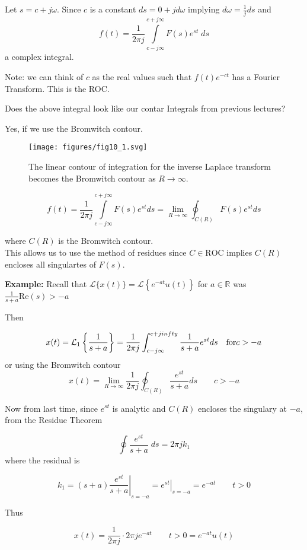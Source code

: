 \documentclass{article}
\begin{document}
Let $s=c+j \omega$. Since $c$ is a constant $ds = 0+j d\omega$ implying $d \omega=\frac{1}{j} d s$
and
$$
f(t)=\frac{1}{2 \pi j} \int\limits_{c-j\infty}^{c+j\infty} F(s) e^{st}\; ds
$$
a complex integral.

Note: we can think of $c$ as the real values such that $f(t) e^{-c t}$ has a Fourier Transform. This is the ROC.

Does the above integral look like our contar Integrals from previous lectures?

Yes, if we use the Bromwitch contour.

\begin{figure}
  \centering
  \texttt{[image: figures/fig10\_1.svg]}
  \caption{The linear contour of integration for the inverse Laplace transform becomes the Bromwitch contour as $R\rightarrow\infty$.}
\end{figure}

$$
f(t)=\frac{1}{2 \pi j} \int\limits_{c-j \infty}^{c+j \infty} F(s) e^{s t} d s = \lim_{R \rightarrow \infty} \oint_{C(R)} F(s) e^{s t} ds
$$

where $C(R)$ is the Bromwitch contour.\\


This allows us to use the method of residues since $C \in \text{ROC}$ implies $C(R)$ encloses all singulartes of $F(s)$.

\textbf{Example:} Recall that $\mathcal{L}\{x(t)\}=\mathcal{L}\left\{e^{-a t} u(t)\right\}$ for $a\in \mathbb{R}$ was $\frac{1}{s+a} \text{Re}(s) > -a$

Then

$$
x(t)=\mathcal{L}_1 \left\{\frac{1}{s+a}\right\}=\frac{1}{2 \pi j} \int_{c-j \infty}^{c+ j\\infty} \frac{1}{s+a} e^{s t} d s \quad \text{for} c > -a
$$
or using the Bromwitch contour
$$
x(t) =\lim_{R \rightarrow \infty} \frac{1}{2 \pi j} \oint_{C(R)} \frac{e^{s t}}{s+a} ds  \qquad c>-a
$$

Now from last time, since $e^{s t}$ is analytic and $C(R)$ encloses the singulary at $-a$, from the Residue Theorem

$$
\oint \frac{e^{st}}{s+a}\; ds = 2\pi j k_1
$$
where the residual is

$$
k_1 = \left. (s+a) \frac{e^{st}}{s+a} \right|_{s = -a} = \left. e^{st} \right|_{s = -a} = e^{-a t} \qquad t > 0  
$$

Thus

$$
x(t) = \frac{1}{2\pi j} \cdot 2\pi j e^{-at} \qquad t > 0 = e^{-at}u(t)
$$
\end{document}
